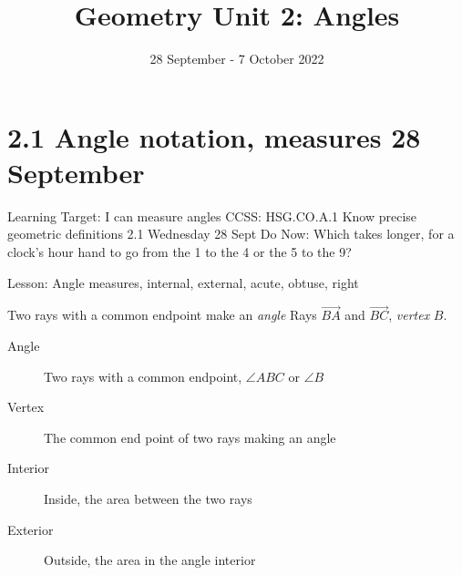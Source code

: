 

\title{Geometry Unit 2: Angles}
\date{28 September - 7 October 2022}


\frame{\titlepage}

\section[Outline]{}
\frame{\tableofcontents}

\section{2.1 Angle notation, measures \hfill 28 September}
\begin{frame}{Learning Target: I can measure angles}
  {CCSS: HSG.CO.A.1 Know precise geometric definitions \hfill \alert{2.1 Wednesday 28 Sept}}
  Do Now: Which takes longer, for a clock's hour hand to go from the 1 to the 4 or the 5 to the 9? \par \bigskip
     \par \bigskip
  Lesson: Angle measures, internal, external, acute, obtuse, right
\end{frame}

\begin{frame}{Two rays with a common endpoint make an \emph{angle}}
  Rays $\overrightarrow{BA}$ and $\overrightarrow{BC}$, \emph{vertex} $B$. \par \bigskip
    \begin{description}
      \item[Angle] Two rays with a common endpoint, $\angle ABC$ or $\angle B$
      \item[Vertex] The common end point of two rays making an angle
      \item[Interior] Inside, the area between the two rays
      \item[Exterior] Outside, the area in the angle interior 
    \end{description}
  \end{frame}


